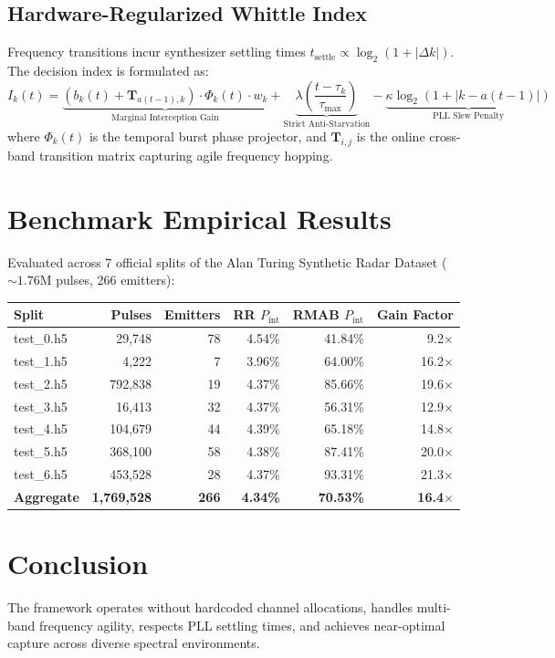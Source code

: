 \documentclass[11pt,a4paper]{article}
\begin{document}
\subsection{Hardware-Regularized Whittle Index}
Frequency transitions incur synthesizer settling times $t_{\text{settle}} \propto \log_2(1 + |\Delta k|)$. The decision index is formulated as:
\begin{equation}
I_k(t) = \underbrace{(b_k(t) + \mathbf{T}_{a(t-1), k}) \cdot \Phi_k(t) \cdot w_k}_{\text{Marginal Interception Gain}} + \underbrace{\lambda \left(\frac{t - \tau_k}{\tau_{\max}}\right)}_{\text{Strict Anti-Starvation}} - \underbrace{\kappa \log_2(1 + |k - a(t-1)|)}_{\text{PLL Slew Penalty}}
\end{equation}
where $\Phi_k(t)$ is the temporal burst phase projector, and $\mathbf{T}_{i,j}$ is the online cross-band transition matrix capturing agile frequency hopping.

\section{Benchmark Empirical Results}
Evaluated across 7 official splits of the Alan Turing Synthetic Radar Dataset ($\sim 1.76\text{M}$ pulses, 266 emitters):

\begin{table}[h]
\centering
\small
\begin{tabular}{lrrrrr}
\toprule
\textbf{Split} & \textbf{Pulses} & \textbf{Emitters} & \textbf{RR $P_{\text{int}}$} & \textbf{RMAB $P_{\text{int}}$} & \textbf{Gain Factor} \\
\midrule
test\_0.h5 & 29,748 & 78 & 4.54\% & 41.84\% & 9.2$\times$ \\
test\_1.h5 & 4,222 & 7 & 3.96\% & 64.00\% & 16.2$\times$ \\
test\_2.h5 & 792,838 & 19 & 4.37\% & 85.66\% & 19.6$\times$ \\
test\_3.h5 & 16,413 & 32 & 4.37\% & 56.31\% & 12.9$\times$ \\
test\_4.h5 & 104,679 & 44 & 4.39\% & 65.18\% & 14.8$\times$ \\
test\_5.h5 & 368,100 & 58 & 4.38\% & 87.41\% & 20.0$\times$ \\
test\_6.h5 & 453,528 & 28 & 4.37\% & 93.31\% & 21.3$\times$ \\
\midrule
\textbf{Aggregate} & \textbf{1,769,528} & \textbf{266} & \textbf{4.34\%} & \textbf{70.53\%} & \textbf{16.4$\times$} \\
\bottomrule
\end{tabular}
\end{table}

\section{Conclusion}
The framework operates without hardcoded channel allocations, handles multi-band frequency agility, respects PLL settling times, and achieves near-optimal capture across diverse spectral environments.
\end{document}
